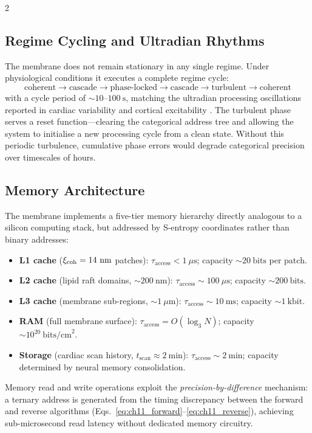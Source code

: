 \begin{multicols}{2}
\subsection{Regime Cycling and Ultradian Rhythms}

The membrane does not remain stationary in any single regime. Under physiological conditions it executes a complete regime cycle:
\begin{equation}
\text{coherent} \to \text{cascade} \to \text{phase-locked} \to \text{cascade} \to \text{turbulent} \to \text{coherent}
\label{eq:ch11_cycle}
\end{equation}
with a cycle period of $\sim 10$--$100\ \mathrm{s}$, matching the ultradian processing oscillations reported in cardiac variability and cortical excitability \citep{kleitman1982basic}. The turbulent phase serves a reset function---clearing the categorical address tree and allowing the system to initialise a new processing cycle from a clean state. Without this periodic turbulence, cumulative phase errors would degrade categorical precision over timescales of hours.

\subsection{Memory Architecture}

The membrane implements a five-tier memory hierarchy directly analogous to a silicon computing stack, but addressed by S-entropy coordinates rather than binary addresses:
\begin{itemize}
\item \textbf{L1 cache} ($\xi_{\mathrm{coh}} = 14\ \mathrm{nm}$ patches): $\tau_{\mathrm{access}} < 1\ \mu\mathrm{s}$; capacity $\sim 20\ \mathrm{bits}$ per patch.
\item \textbf{L2 cache} (lipid raft domains, $\sim 200\ \mathrm{nm}$): $\tau_{\mathrm{access}} \sim 100\ \mu\mathrm{s}$; capacity $\sim 200\ \mathrm{bits}$.
\item \textbf{L3 cache} (membrane sub-regions, $\sim 1\ \mu\mathrm{m}$): $\tau_{\mathrm{access}} \sim 10\ \mathrm{ms}$; capacity $\sim 1\ \mathrm{kbit}$.
\item \textbf{RAM} (full membrane surface): $\tau_{\mathrm{access}} = O(\log_3 N)$; capacity $\sim 10^{20}\ \mathrm{bits/cm}^2$.
\item \textbf{Storage} (cardiac scan history, $t_{\mathrm{scan}} \approx 2\ \mathrm{min}$): $\tau_{\mathrm{access}} \sim 2\ \mathrm{min}$; capacity determined by neural memory consolidation.
\end{itemize}

Memory read and write operations exploit the \emph{precision-by-difference} mechanism: a ternary address is generated from the timing discrepancy between the forward and reverse algorithms (Eqs.~\ref{eq:ch11_forward}--\ref{eq:ch11_reverse}), achieving sub-microsecond read latency without dedicated memory circuitry.

\end{multicols}

